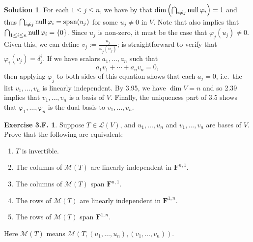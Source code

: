 \documentclass[12pt]{article}
\theoremstyle{definition}
\theoremstyle{exercise}
\newtheorem{exercise}{Exercise 3.F.}
\theoremstyle{solution}
\newtheorem*{solution}{Solution}
\newcommand{\lmap}{\mathcal{L}}
\newcommand{\mat}{\mathcal{M}}
\newcommand{\Span}{\text{span}}
\newcommand{\Null}{\text{null\,}}
\newcommand{\F}{\mathbf{F}}
\begin{document}
\begin{solution}
    For each \( 1 \leq j \leq n \), we have by  that \( \dim \left( \bigcap_{i \neq j} \Null \varphi_i \right) = 1 \) and thus \( \bigcap_{i \neq j} \Null \varphi_i = \Span(u_j) \) for some \( u_j \neq 0 \) in \( V \). Note that  also implies that \( \bigcap_{1 \leq i \leq n} \Null \varphi_i = \{ 0 \} \). Since \( u_j \) is non-zero, it must be the case that \( \varphi_j(u_j) \neq 0 \). Given this, we can define \( v_j := \tfrac{u_j}{\varphi_j(u_j)} \); is straightforward to verify that \( \varphi_i(v_j) = \delta^i_j \). If we have scalars \( a_1, \ldots, a_n \) such that
    \[
        a_1 v_1 + \cdots + a_n v_n = 0,
    \]
    then applying \( \varphi_j \) to both sides of this equation shows that each \( a_j = 0 \), i.e.\ the list \( v_1, \ldots, v_n \) is linearly independent. By 3.95, we have \( \dim V = n \) and so 2.39 implies that \( v_1, \ldots, v_n \) is a basis of \( V \). Finally, the uniqueness part of 3.5 shows that \( \varphi_1, \ldots, \varphi_n \) is the dual basis to \( v_1, \ldots, v_n \).
\end{solution}

\begin{exercise}
\label{ex:32}
    Suppose \( T \in \lmap(V) \), and \( u_1, \ldots, u_n \) and \( v_1, \ldots, v_n \) are bases of \( V \). Prove that the following are equivalent:
    \begin{enumerate}
        \item \( T \) is invertible.

        \item The columns of \( \mat(T) \) are linearly independent in \( \F^{n,1} \).

        \item The columns of \( \mat(T) \) span \( \F^{n,1} \).

        \item The rows of \( \mat(T) \) are linearly independent in \( \F^{1,n} \).

        \item The rows of \( \mat(T) \) span \( \F^{1,n} \).
    \end{enumerate}
    Here \( \mat(T) \) means \( \mat(T, (u_1, \ldots, u_n), (v_1, \ldots, v_n)) \).
\end{exercise}
\end{document}
